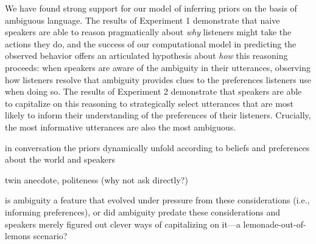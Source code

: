 \documentclass[10pt,a4paper]{article}
\begin{document}
We have found strong support for our model of inferring priors on the basis of ambiguous language. The results of Experiment 1 demonstrate that naive speakers are able to reason pragmatically about \emph{why} listeners might take the actions they do, and the success of our computational model in predicting the observed behavior offers an articulated hypothesis about \emph{how} this reasoning proceeds: when speakers are aware of the ambiguity in their utterances, observing how listeners resolve that ambiguity provides clues to the preferences listeners use when doing so. The results of Experiment 2 demonstrate that speakers are able to capitalize on this reasoning to strategically select utterances that are most likely to inform their understanding of the preferences of their listeners. Crucially, the most informative utterances are also the most ambiguous.


in conversation the priors dynamically unfold according to beliefs and preferences about the world and speakers

twin anecdote, politeness (why not ask directly?)

is ambiguity a feature that evolved under pressure from these considerations (i.e., informing preferences), or did ambiguity predate these considerations and speakers merely figured out clever ways of capitalizing on it---a lemonade-out-of-lemons scenario?


\setlength{\bibleftmargin}{.125in}
\setlength{\bibindent}{-\bibleftmargin}


\end{document}
